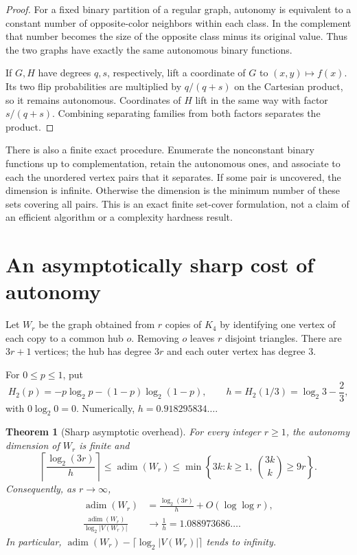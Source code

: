\documentclass[11pt]{article}
\newtheorem{theorem}{Theorem}[section]
\theoremstyle{definition}
\newcommand{\adim}{\operatorname{adim}}
\newcommand{\HH}{H_2}
\numberwithin{equation}{section}
\begin{document}
\begin{proof}
For a fixed binary partition of a regular graph, autonomy is equivalent
to a constant number of opposite-color neighbors within each class.
In the complement that number becomes the size of the opposite class
minus its original value. Thus the two graphs have exactly the same
autonomous binary functions.

If $G,H$ have degrees $q,s$, respectively, lift a coordinate of $G$ to
$(x,y)\mapsto f(x)$. Its two flip probabilities are multiplied by
$q/(q+s)$ on the Cartesian product, so it remains autonomous. Coordinates
of $H$ lift in the same way with factor $s/(q+s)$. Combining separating
families from both factors separates the product.
\end{proof}

There is also a finite exact procedure. Enumerate the nonconstant binary
functions up to complementation, retain the autonomous ones, and associate
to each the unordered vertex pairs that it separates. If some pair is
uncovered, the dimension is infinite. Otherwise the dimension is the
minimum number of these sets covering all pairs. This is an exact finite
set-cover formulation, not a claim of an efficient algorithm or a
complexity hardness result.

\section{An asymptotically sharp cost of autonomy}

Let $W_r$ be the graph obtained from $r$ copies of $K_4$ by identifying one
vertex of each copy to a common hub $o$. Removing $o$ leaves $r$ disjoint
triangles. There are $3r+1$ vertices; the hub has degree $3r$ and each
outer vertex has degree $3$.

For $0\leq p\leq1$, put
\[
 \HH(p)=-p\log_2 p-(1-p)\log_2(1-p),\qquad
 h=\HH(1/3)=\log_2 3-\frac23,
\]
with $0\log_2 0=0$. Numerically, $h=0.918295834\ldots$.

\begin{theorem}[Sharp asymptotic overhead]\label{thm:windmill}
For every integer $r\geq1$, the autonomy dimension of $W_r$ is finite and
\begin{equation}\label{eq:windmillbounds}
 \left\lceil\frac{\log_2(3r)}{h}\right\rceil
 \leq\adim(W_r)
 \leq\min\left\{3k:k\geq1,\ \binom{3k}{k}\geq9r\right\}.
\end{equation}
Consequently, as $r\to\infty$,
\begin{align}
 \adim(W_r)&=\frac{\log_2(3r)}{h}+O(\log\log r),\label{eq:windasymp}\\
 \frac{\adim(W_r)}{\log_2|V(W_r)|}&\longrightarrow
 \frac1h=1.088973686\ldots.\label{eq:windratio}
\end{align}
In particular, $\adim(W_r)-\lceil\log_2|V(W_r)|\rceil$ tends to infinity.
\end{theorem}
\end{document}
